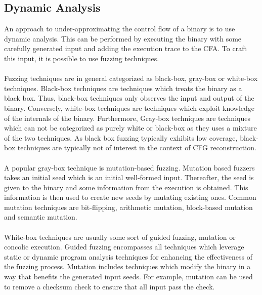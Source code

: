 \documentclass{kththesis}
\newcommand{\fbcomment}[1]{{#1}}
\renewcommand{\fbcomment}[1]{}
\begin{document}
\subsection{Dynamic Analysis}
\fbcomment{\color{red}Goal: Describe different alternatives to directed symbolic execution and why directed symbolic execution was selected(For example, the example of "if(x=2)")}
An approach to under-approximating the control flow of a binary is to use dynamic analysis. This can be performed by executing the binary with some carefully generated input and adding the execution trace to the CFA. To craft this input, it is possible to use fuzzing techniques.
\\ \\
Fuzzing techniques are in general categorized as black-box, gray-box or white-box techniques\cite{fuzzingSurvey}. Black-box techniques are techniques which treats the binary as a black box. Thus, black-box techniques only observes the input and output of the binary. Conversely, white-box techniques are techniques which exploit knowledge of the internals of the binary. Furthermore, Gray-box techniques are techniques which can not be categorized as purely white or black-box as they uses a mixture of the two techniques. As black box fuzzing typically exhibits low coverage, black-box techniques are typically not of interest in the context of CFG reconstruction\cite{fuzzingSurvey}.
\\ \\
A popular gray-box technique is mutation-based fuzzing. Mutation based fuzzers takes an initial seed which is an initial well-formed input. Thereafter, the seed is given to the binary and some information from the execution is obtained. This information is then used to create new seeds by mutating existing ones. Common mutation techniques are bit-flipping, arithmetic mutation, block-based mutation and semantic mutation\cite{fuzzingSurvey}.
\\ \\ 
White-box techniques are usually some sort of guided fuzzing, mutation or concolic execution\cite{fuzzingSurvey}. Guided fuzzing encompasses all techniques which leverage static or dynamic program analysis techniques for enhancing the effectiveness of the fuzzing process. Mutation includes techniques which modify the binary in a way that benefits the generated input seeds. For example, mutation can be used to remove a checksum check to ensure that all input pass the check\cite{fuzzingSurvey}.
\end{document}
